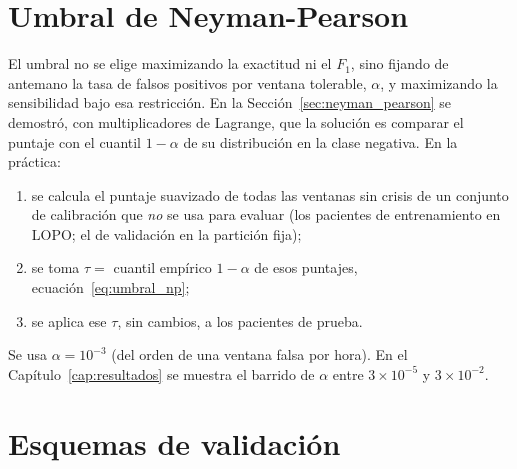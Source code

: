 \section{Umbral de Neyman-Pearson}
\label{sec:umbral_np}

El umbral no se elige maximizando la exactitud ni el $F_1$, sino fijando de antemano la tasa de falsos positivos por
ventana tolerable, $\alpha$, y maximizando la sensibilidad bajo esa restricción. En la Sección~\ref{sec:neyman_pearson}
se demostró, con multiplicadores de Lagrange, que la solución es comparar el puntaje con el cuantil $1 - \alpha$ de su
distribución en la clase negativa. En la práctica:
\begin{enumerate}
  \item se calcula el puntaje suavizado de todas las ventanas sin crisis de un conjunto de calibración que \emph{no} se
        usa para evaluar (los pacientes de entrenamiento en LOPO; el de validación en la partición fija);
  \item se toma $\tau = $ cuantil empírico $1 - \alpha$ de esos puntajes, ecuación~\eqref{eq:umbral_np};
  \item se aplica ese $\tau$, sin cambios, a los pacientes de prueba.
\end{enumerate}
Se usa $\alpha = 10^{-3}$ (del orden de una ventana falsa por hora). En el Capítulo~\ref{cap:resultados} se muestra
el barrido de $\alpha$ entre $3\times10^{-5}$ y $3\times10^{-2}$.

\section{Esquemas de validación}
\label{sec:validacion}

